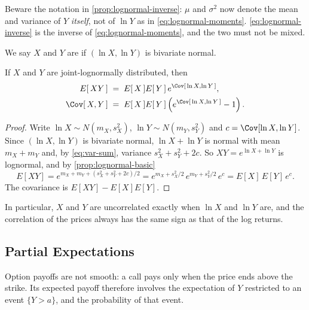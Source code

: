 \begin{note}
	Beware the notation in \autoref{prop:lognormal-inverse}: $\mu$ and $\sigma^{2}$ now denote the mean and variance of $Y$ \emph{itself}, not of $\ln Y$ as in \eqref{eq:lognormal-moments}.
	\eqref{eq:lognormal-inverse} is the inverse of \eqref{eq:lognormal-moments}, and the two must not be mixed.
\end{note}

We say $X$ and $Y$ are  if $(\ln X,\ln Y)$ is bivariate normal.
\suppend

\begin{proposition}
	If $X$ and $Y$ are joint-lognormally distributed, then
\begin{equation}
		\begin{aligned}
			E[\,XY\,]      & \;=\; E[\,X\,]E[\,Y\,]\,e^{\Cov[\,\ln X,\ln Y\,]} ,                     \\
			\Cov[\,X,Y\,]  & \;=\; E[\,X\,]E[\,Y\,]\left(e^{\Cov[\,\ln X,\ln Y\,]}-1\right) .
		\end{aligned}\label{eq:joint-lognormal}
	\end{equation}
\end{proposition}

\suppstart
\begin{proof}
	Write $\ln X\sim N(m_{X},s_{X}^{2})$, $\ln Y\sim N(m_{Y},s_{Y}^{2})$ and $c=\Cov[\ln X,\ln Y]$.
	Since $(\ln X,\ln Y)$ is bivariate normal, $\ln X+\ln Y$ is normal with mean $m_{X}+m_{Y}$ and, by \eqref{eq:var-sum}, variance $s_{X}^{2}+s_{Y}^{2}+2c$.
	So $XY=e^{\ln X+\ln Y}$ is lognormal, and by \autoref{prop:lognormal-basic}
	\[
		E[XY]=e^{m_{X}+m_{Y}+(s_{X}^{2}+s_{Y}^{2}+2c)/2}
		=e^{m_{X}+s_{X}^{2}/2}\,e^{m_{Y}+s_{Y}^{2}/2}\,e^{c}
		=E[X]\,E[Y]\,e^{c} .
	\]
	The covariance is $E[XY]-E[X]E[Y]$.
\end{proof}

In particular, $X$ and $Y$ are uncorrelated exactly when $\ln X$ and $\ln Y$ are, and the correlation of the prices always has the same sign as that of the log returns.
\suppend

\subsection{Partial Expectations}


\suppstart
Option payoffs are not smooth: a call pays only when the price ends above the strike.
Its expected payoff therefore involves the expectation of $Y$ restricted to an event $\{Y>a\}$, and the probability of that event.
\suppend

